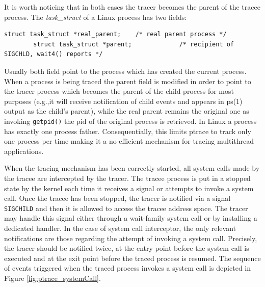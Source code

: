 It is worth noticing that in both cases the tracer becomes the parent of the tracee process. The \emph{task\_struct} of a Linux process has two fields:
\begin{center}
\begin{lstlisting}[caption={ Parent and real parent fields with task\_struct Linux}]
		struct task_struct *real_parent;	/* real parent process */
		struct task_struct *parent;				/* recipient of SIGCHLD, wait4() reports */
\end{lstlisting}
\end{center}
Usually both field point to the process which has created the current process. When a process is being traced the parent field is modified in order to point to the tracer process which becomes the parent of the child process for most purposes (e.g.,it will receive notification of  child  events  and  appears  in ps(1)  output  as  the  child's parent), while the real parent remains the original one as invoking \lstinline$getpid()$ the pid of the original process is retrieved. In Linux a process has exactly one process father. Consequentially, this limits ptrace to track only one process per time making it a no-efficient mechanism for tracing multithread applications. 


When the tracing mechanism has been correctly started, all system calls made by the tracee are intercepted by the tracer. The tracee process is put in a stopped state by the kernel each time it receives a signal or attempts to invoke a system call.  Once the tracee has been stopped, the tracer is notified via a signal \lstinline$SIGCHILD$ and then it is allowed to access the tracee address space.  The tracer may handle this signal either through a wait-family system call or by installing a dedicated handler. 
In the case of system call interceptor, the only relevant notifications are those regarding the attempt of invoking a system call. Precisely, the tracer should be notified twice, at the entry point before the system call is executed and at the exit point before the traced process is resumed. The sequence of events triggered when the traced process invokes a system call is depicted in Figure  \ref{fig:ptrace_systemCall}.

